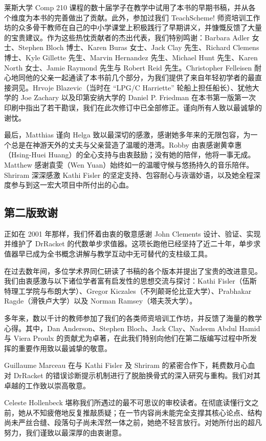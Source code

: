 莱斯大学 Comp 210 课程的数十届学子在教学中试用了本书的早期书稿，并从各个维度为本书的完善做出了贡献。此外，参加过我们 TeachScheme! 师资培训工作坊的众多骨干教师在自己的中小学课堂上积极践行了早期讲义，并慷慨反馈了大量的宝贵建议。作为这些热忱贡献者的杰出代表，我们特别鸣谢：Barbara Adler 女士、Stephen Bloch 博士、Karen Buras 女士、Jack Clay 先生、Richard Clemens 博士、Kyle Gillette 先生、Marvin Hernandez 先生、Michael Hunt 先生、Karen North 女士、Jamie Raymond 先生与 Robert Reid 先生。Christopher Felleisen 耐心地同他的父亲一起通读了本书前几个部分，为我们提供了来自年轻初学者的最直接洞见。Hrvoje Blazevic（当时在 ``LPG/C Harriette'' 轮船上担任船长）、犹他大学的 Joe Zachary 以及印第安纳大学的 Daniel P. Friedman 在本书第一版第一次印刷中指出了若干勘误，我们在此次修订中已全部修正。谨向所有人致以最诚挚的谢忱。

最后，Matthias 谨向 Helga 致以最深切的感激，感谢她多年来的无限包容，为一个总是在神游天外的丈夫与父亲营造了温暖的港湾。Robby 由衷感谢黄幸惠（Hsing-Huei Huang）的全心支持与由衷鼓励；没有她的陪伴，他将一事无成。Matthew 感谢袁雯（Wen Yuan）始终如一的温暖守候与悠扬持久的音乐陪伴。Shriram 深深感激 Kathi Fisler 的坚定支持、包容耐心与诙谐妙语，以及她全程深度参与到这一宏大项目中所付出的心血。

\subsection*{第二版致谢}

正如在 2001 年那样，我们怀着由衷的敬意感谢 John Clements 设计、验证、实现并维护了 DrRacket 的代数单步求值器。这项长跑他已经坚持了近二十年，单步求值器早已成为全书概念讲解与教学互动中无可替代的支柱级工具。

在过去数年间，多位学术界同仁研读了书稿的各个版本并提出了宝贵的改进意见。我们由衷感激与以下诸位学者富有启发性的思想交流与探讨：Kathi Fisler（伍斯特理工学院与布朗大学）、Gregor Kiczales（不列颠哥伦比亚大学）、Prabhakar Ragde（滑铁卢大学）以及 Norman Ramsey（塔夫茨大学）。

多年来，数以千计的教师参加了我们的各类师资培训工作坊，并反馈了海量的教学心得。其中，Dan Anderson、Stephen Bloch、Jack Clay、Nadeem Abdul Hamid 与 Viera Proulx 的贡献尤为卓著，在此我们特别向他们在第二版编写过程中所发挥的重要作用致以最诚挚的敬意。

Guillaume Marceau 在与 Kathi Fisler 及 Shriram 的紧密合作下，耗费数月心血对 DrRacket 的错误诊断提示机制进行了脱胎换骨式的深入研究与重构。我们对其卓越的工作致以崇高敬意。

Celeste Hollenbeck 堪称我们所遇过的最不可思议的审校读者。在彻底读懂行文之前，她从不知疲倦地反复推敲质疑；在一节内容尚未能完全支撑其核心论点、结构尚未严丝合缝、段落句子尚未浑然一体之前，她绝不轻言放行。对她所付出的超凡努力，我们谨致以最深厚的由衷谢意。


